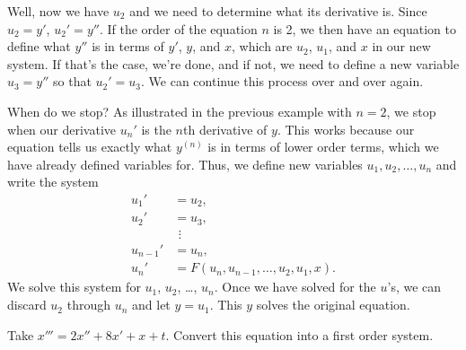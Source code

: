 \documentclass{ximera}
\begin{document}
Well, now we have $u_2$ and we need to determine what its derivative is. Since $u_2 = y'$, $u_2' = y''$. If the order of the equation $n$ is 2, we then have an equation to define what $y''$ is in terms of $y'$, $y$, and $x$, which are $u_2$, $u_1$, and $x$ in our new system. If that's the case, we're done, and if not, we need to define a new variable $u_3 = y''$ so that $u_2' = u_3$. We can continue this process over and over again. 

When do we stop? As illustrated in the previous example with $n=2$, we stop when our derivative $u_n'$ is the $n$th derivative of $y$. This works because our equation tells us exactly what $y^{(n)}$ is in terms of lower order terms, which we have already defined variables for. Thus, we define new variables $u_1, u_2, \ldots, u_n$ and write the system
\begin{align*}
    u_1' & = u_2 , \\
    u_2' & = u_3 , \\
    & ~\, \vdots \\
    u_{n-1}' & = u_n , \\
    u_n' & = F(u_n,u_{n-1},\ldots,u_2,u_1,x) .
\end{align*}
We solve this system for $u_1$, $u_2$, \ldots, $u_n$.  Once we have solved for the $u$'s, we can discard $u_2$ through $u_n$ and let $y = u_1$. This $y$ solves the original equation.

\begin{example}
    Take $x''' = 2x''+ 8x' + x + t$.  Convert this equation into a first order system. 
\end{example}
\end{document}
